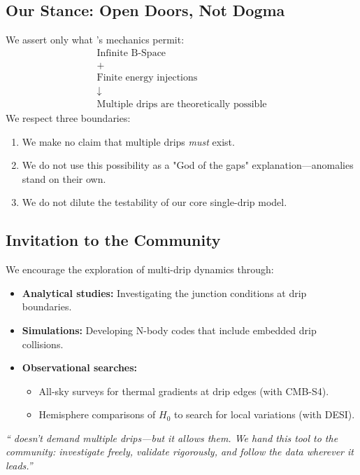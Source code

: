 \documentclass{BSpacePaper} %
\begin{document}
\begin{appendices}
\subsection{Our Stance: Open Doors, Not Dogma}
We assert only what \bspace{}’s mechanics permit:
\[
\begin{array}{c}
\text{Infinite B-Space} \\
+ \\
\text{Finite energy injections} \\
\downarrow \\
\text{Multiple drips are theoretically possible}
\end{array}
\]
We respect three boundaries:
\begin{enumerate}
    \item We make no claim that multiple drips \textit{must} exist.
    \item We do not use this possibility as a "God of the gaps" explanation—anomalies stand on their own.
    \item We do not dilute the testability of our core single-drip model.
\end{enumerate}

\subsection{Invitation to the Community}
We encourage the exploration of multi-drip dynamics through:
\begin{itemize}
    \item \textbf{Analytical studies:} Investigating the junction conditions at drip boundaries.
    \item \textbf{Simulations:} Developing N-body codes that include embedded drip collisions.
    \item \textbf{Observational searches:}
    \begin{itemize}
        \item All-sky surveys for thermal gradients at drip edges (with CMB-S4).
        \item Hemisphere comparisons of \(H_0\) to search for local variations (with DESI).
    \end{itemize}
\end{itemize}
\begin{center}
    \textit{``\bspace{} doesn’t demand multiple drips—but it allows them. We hand this tool to the community: investigate freely, validate rigorously, and follow the data wherever it leads.''}
\end{center}


\end{appendices}
\end{document}

